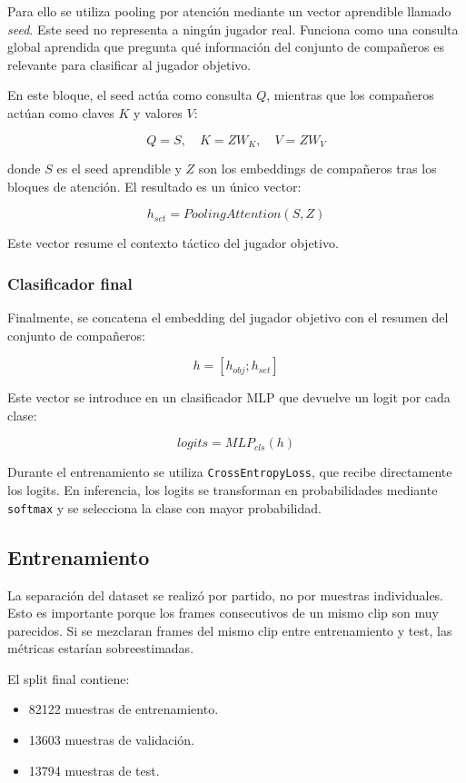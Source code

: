 Para ello se utiliza pooling por atención mediante un vector aprendible llamado \textit{seed}. Este seed no representa a ningún jugador real. Funciona como una consulta global aprendida que pregunta qué información del conjunto de compañeros es relevante para clasificar al jugador objetivo.

En este bloque, el seed actúa como consulta $Q$, mientras que los compañeros actúan como claves $K$ y valores $V$:

\[
Q = S,\quad K = ZW_K,\quad V = ZW_V
\]

donde $S$ es el seed aprendible y $Z$ son los embeddings de compañeros tras los bloques de atención. El resultado es un único vector:

\[
h_{set} = PoolingAttention(S, Z)
\]

Este vector resume el contexto táctico del jugador objetivo.

\subsubsection{Clasificador final}

Finalmente, se concatena el embedding del jugador objetivo con el resumen del conjunto de compañeros:

\[
h = [h_{obj}; h_{set}]
\]

Este vector se introduce en un clasificador MLP que devuelve un logit por cada clase:

\[
logits = MLP_{cls}(h)
\]

Durante el entrenamiento se utiliza \texttt{CrossEntropyLoss}, que recibe directamente los logits. En inferencia, los logits se transforman en probabilidades mediante \texttt{softmax} y se selecciona la clase con mayor probabilidad.

\subsection{Entrenamiento}

La separación del dataset se realizó por partido, no por muestras individuales. Esto es importante porque los frames consecutivos de un mismo clip son muy parecidos. Si se mezclaran frames del mismo clip entre entrenamiento y test, las métricas estarían sobreestimadas.

El split final contiene:

\begin{itemize}
    \item 82122 muestras de entrenamiento.
    \item 13603 muestras de validación.
    \item 13794 muestras de test.
\end{itemize}

